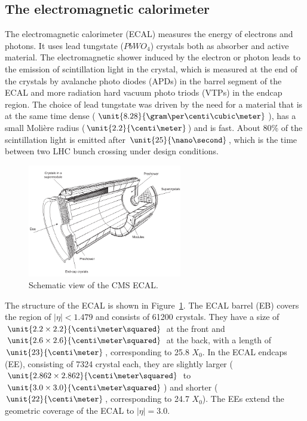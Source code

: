 \subsection{The electromagnetic calorimeter}
The electromagnetic calorimeter (ECAL) measures the energy of electrons and photons. It uses lead tungstate ($PbWO_4$) crystals both as absorber and active material. The electromagnetic shower induced by the electron or photon leads to the emission of scintillation light in the crystal, which is measured at the end of the crystals by avalanche photo diodes (APDs) in the barrel segment of the ECAL and more radiation hard vacuum photo triods (VTPs) in the endcap region. The choice of lead tungstate was driven by the need for a material that is at the same time dense ($\unit{8.28}{\gram\per\centi\cubic\meter}$), has a small Molière radius ($\unit{2.2}{\centi\meter}$) and is fast. About 80\% of the scintillation light is emitted after $\unit{25}{\nano\second}$, which is the time between two LHC bunch crossing under design conditions. 
\begin{figure}[htbp]
\centering
  \includegraphics[width=0.6\textwidth]{plots/CMS/ECAL.png}
\caption{Schematic view of the CMS ECAL.}
\label{fig:ECAL}
\end{figure} 
The structure of the ECAL is shown in Figure~\ref{fig:ECAL}. The ECAL barrel (EB) covers the region of $\vert \eta \vert < 1.479$ and consists of 61200 crystals. They have a size of $\unit{2.2\times2.2}{\centi\meter\squared}$ at the front and $\unit{2.6\times2.6}{\centi\meter\squared}$ at the back, with a length of $\unit{23}{\centi\meter}$, corresponding to 25.8 $X_0$. In the ECAL endcaps (EE), consisting of 7324 crystal each, they are slightly larger ($\unit{2.862\times2.862}{\centi\meter\squared}$ to $\unit{3.0\times3.0}{\centi\meter\squared}$) and shorter ($\unit{22}{\centi\meter}$, corresponding to 24.7 $X_0$). The EEs extend the geometric coverage of the ECAL to $\vert \eta \vert = 3.0$. 

